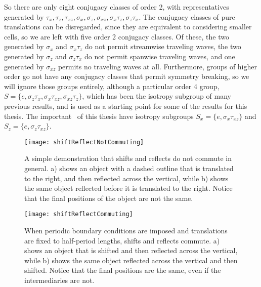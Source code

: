 So there are only eight conjugacy classes of order 2, with representatives generated by $\tau_x,\tau_z,\tau_{xz}, \sigma_x,\sigma_z,\sigma_{xz},\sigma_{x}\tau_z,\sigma_z\tau_x$. The conjugacy classes of pure translations can be disregarded, since they are equivalent to considering smaller cells, so we are left with five order 2 conjugacy classes. Of these, the two  generated by $\sigma_x$ and $\sigma_x\tau_z$ do not permit streamwise traveling waves, the two generated by $\sigma_z$ and $\sigma_z\tau_x$ do not permit spanwise traveling waves, and one generated by  $\sigma_{xz}$ permits no traveling waves at all. Furthermore, groups of higher order go not have any conjugacy classes that permit symmetry breaking, so we will ignore those groups entirely, although a particular order 4 group, $S = \{ e, \sigma_z\tau_x,\sigma_x\tau_{xz},\sigma_{xz}\tau_z\}$, which has been the isotropy subgroup of many previous results, and is used as a starting point for some of the results for this thesis. The important \ecs\ of this thesis have isotropy subgroups $S_x = \{ e, \sigma_x\tau_{xz}\}$ and $S_z = \{e, \sigma_z\tau_{xz}\}$. 
\begin{figure}[t!]
\texttt{[image: shiftReflectNotCommuting]}
\caption{A simple demonstration that shifts and reflects do not commute in general. a) shows an object with a dashed outline that is translated to the right, and then reflected across the vertical, while b) shows the same object reflected before it is translated to the right. Notice that the final positions of the object are not the same.}\label{fig:notabelian}
\end{figure}

\begin{figure}[t!]
\texttt{[image: shiftReflectCommuting]}
\caption{When periodic boundary conditions are imposed and translations are fixed to half-period lengths, shifts and reflects commute. a) shows an object that is shifted and then reflected across the vertical, while b) shows the same object reflected across the vertical and then shifted. Notice that the final positions are the same, even if the intermediaries are not.}\label{fig:abelian}
\end{figure}
  
